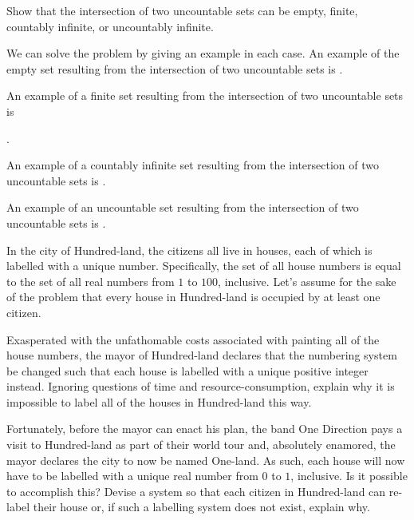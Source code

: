 \documentclass[solution, letterpaper]{cs20}
\begin{document}

Show that the intersection of two uncountable sets can be empty, finite, countably
infinite, or uncountably infinite.

\begin{solution}
We can solve the problem by giving an example in each case. An example of the empty set resulting from the intersection of two uncountable sets is \fbox{$\big[0,1\big] \cap \big[2,3\big] = \emptyset$}.
\newline

\noindent An example of a finite set resulting from the intersection of two uncountable sets is 

\noindent {}.
\newline

\noindent An example of a countably infinite set resulting from the intersection of two uncountable sets is .
\newline

\noindent An example of an uncountable set resulting from the intersection of two uncountable sets is .
\end{solution}

In the city of Hundred-land, the citizens all live in houses, each of which is labelled with a unique number. Specifically, the set of all house numbers is equal to the set of all real numbers from $1$ to $100$, inclusive. Let's assume for the sake of the problem that every house in Hundred-land is occupied by at least one citizen.

\subproblem Exasperated with the unfathomable costs associated with painting all of the house numbers, the mayor of Hundred-land declares that the numbering system be changed such that each house is labelled with a unique positive integer instead. Ignoring questions of time and resource-consumption, explain why it is impossible to label all of the houses in Hundred-land this way.

\subproblem Fortunately, before the mayor can enact his plan, the band One Direction pays a visit to Hundred-land as part of their world tour and, absolutely enamored, the mayor declares the city to now be named One-land. As such, each house will now have to be labelled with a unique real number from $0$ to $1$, inclusive. Is it possible to accomplish this? Devise a system so that each citizen in Hundred-land can re-label their house or, if such a labelling system does not exist, explain why.
\end{document}
